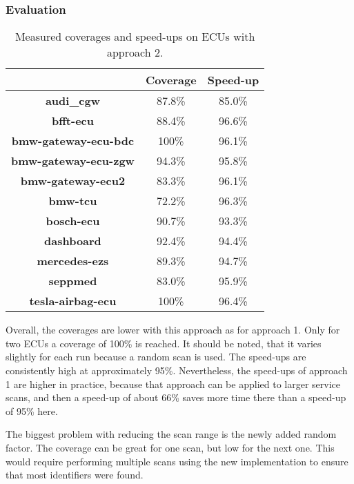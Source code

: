 \subsubsection{Evaluation}

\begin{table}[h]
    \begin{center}
    \begin{tabular}{ccc}
        \hline
        & \textbf{Coverage} & \textbf{Speed-up} \\
        \hline
        \textbf{audi\_cgw} & 87.8\% & 85.0\% \\
        \textbf{bfft-ecu} & 88.4\% & 96.6\% \\
        \textbf{bmw-gateway-ecu-bdc} & 100\% & 96.1\% \\
        \textbf{bmw-gateway-ecu-zgw} & 94.3\% & 95.8\% \\
        \textbf{bmw-gateway-ecu2} & 83.3\% & 96.1\% \\
        \textbf{bmw-tcu} & 72.2\% & 96.3\% \\
        \textbf{bosch-ecu} & 90.7\% & 93.3\% \\
        \textbf{dashboard} & 92.4\% & 94.4\% \\
        \textbf{mercedes-ezs} & 89.3\% & 94.7\% \\
        \textbf{seppmed} & 83.0\% & 95.9\% \\
        \textbf{tesla-airbag-ecu} & 100\% & 96.4\% \\
        \hline
    \end{tabular}
    \end{center}
    \caption{Measured coverages and speed-ups on ECUs with approach 2.}
    \label{tab:evaluation-approach2}
\end{table}

Overall, the coverages are lower with this approach as for approach 1. Only for two ECUs a coverage of 100\% is reached. It should be noted, that it varies slightly for each run because a random scan is used. The speed-ups are consistently high at approximately 95\%. Nevertheless, the speed-ups of approach 1 are higher in practice, because that approach can be applied to larger service scans, and then a speed-up of about 66\% saves more time there than a speed-up of 95\% here.

The biggest problem with reducing the scan range is the newly added random factor. The coverage can be great for one scan, but low for the next one. This would require performing multiple scans using the new implementation to ensure that most identifiers were found.


